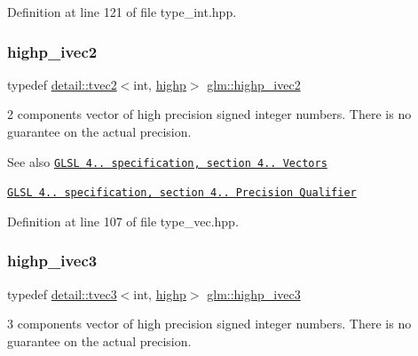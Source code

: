Definition at line 121 of file type\+\_\+int.\+hpp.

\mbox{\label{group__core__precision_gab2bac6095f51f7d7f74747afc2f6747a}} 
\subsubsection{\texorpdfstring{highp\+\_\+ivec2}{highp\_ivec2}}
{\footnotesize\ttfamily typedef \hyperlink{structglm_1_1detail_1_1tvec2}{detail\+::tvec2}$<$int, \hyperlink{namespaceglm_a0f04f086094c747d227af4425893f545ac6f7eab42eacbb10d59a58e95e362074}{highp}$>$ \hyperlink{group__core__precision_gab2bac6095f51f7d7f74747afc2f6747a}{glm\+::highp\+\_\+ivec2}}

2 components vector of high precision signed integer numbers. There is no guarantee on the actual precision.

\begin{DoxySeeAlso}{See also}
\href{http://www.opengl.org/registry/doc/GLSLangSpec.4.20.8.pdf}{\tt G\+L\+SL 4.. specification, section 4.. Vectors} 

\href{http://www.opengl.org/registry/doc/GLSLangSpec.4.20.8.pdf}{\tt G\+L\+SL 4.. specification, section 4.. Precision Qualifier} 
\end{DoxySeeAlso}


Definition at line 107 of file type\+\_\+vec.\+hpp.

\mbox{\label{group__core__precision_gae9f0a321de8ee92dce9d4400362d71e7}} 
\subsubsection{\texorpdfstring{highp\+\_\+ivec3}{highp\_ivec3}}
{\footnotesize\ttfamily typedef \hyperlink{structglm_1_1detail_1_1tvec3}{detail\+::tvec3}$<$int, \hyperlink{namespaceglm_a0f04f086094c747d227af4425893f545ac6f7eab42eacbb10d59a58e95e362074}{highp}$>$ \hyperlink{group__core__precision_gae9f0a321de8ee92dce9d4400362d71e7}{glm\+::highp\+\_\+ivec3}}

3 components vector of high precision signed integer numbers. There is no guarantee on the actual precision.

